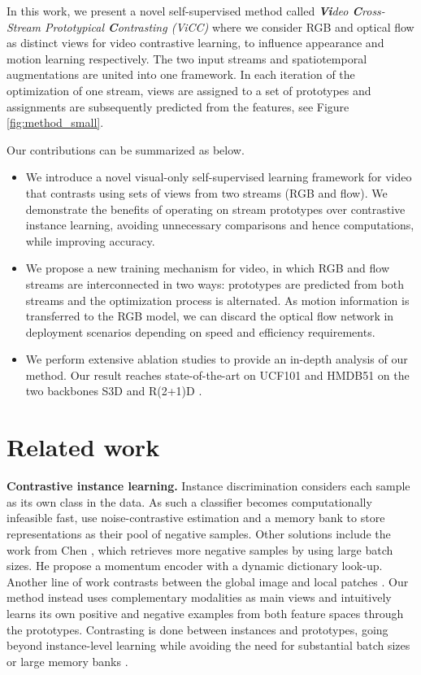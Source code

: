 \documentclass[10pt,twocolumn,letterpaper]{article}
\begin{document}
In this work, we present a novel self-supervised method called \noindent \textit{\noindent \textbf{Vi}deo \noindent \textbf{C}ross-Stream Prototypical \noindent \textbf{C}ontrasting (ViCC)} where we consider RGB and optical flow as distinct views for video contrastive learning, to influence appearance and motion learning respectively. The two input streams and spatiotemporal augmentations are united into one framework. In each iteration of the optimization of one stream, views are assigned to a set of prototypes and assignments are subsequently predicted from the features, see Figure \ref{fig:method_small}. 

Our contributions can be summarized as below.
\begin{itemize}[topsep=0pt,itemsep=-1ex,partopsep=1ex,parsep=1ex, leftmargin=*]
\item We introduce a novel visual-only self-supervised learning framework for video that contrasts using sets of views from two streams (RGB and flow). We demonstrate the benefits of operating on stream prototypes over contrastive instance learning, avoiding unnecessary comparisons and hence computations, while improving accuracy. 
\item We propose a new training mechanism for video, in which RGB and flow streams are interconnected in two ways: prototypes are predicted from both streams and the optimization process is alternated. As motion information is transferred to the RGB model, we can discard the optical flow network in deployment scenarios depending on speed and efficiency requirements. 
\item We perform extensive ablation studies to provide an in-depth analysis of our method. Our result reaches state-of-the-art on UCF101 \cite{soomro_ucf101_2012} and HMDB51 \cite{kuehne_hmdb_2011} on the two backbones S3D \cite{xie_rethinking_2018} and R(2+1)D \cite{tran_closer_2018}.
\end{itemize}

 \section{Related work}
\textbf{Contrastive instance learning.} Instance discrimination considers each sample as its own class in the data. As such a classifier becomes computationally infeasible fast, \cite{wu_unsupervised_2018} use noise-contrastive estimation \cite{gutmann_noise-contrastive_2012} and a memory bank to store representations as their pool of negative samples. Other solutions include the work from Chen \etal \cite{chen_improved_2020}, which retrieves more negative samples by using large batch sizes. He \etal \cite{he_momentum_2020} propose a momentum encoder with a dynamic dictionary look-up. Another line of work contrasts between the global image and local patches \cite{oord_representation_2019, hjelm_learning_2019}. Our method instead uses complementary modalities as main views and intuitively learns its own positive and negative examples from both feature spaces through the prototypes. Contrasting is done between instances and prototypes, going beyond instance-level learning while avoiding the need for substantial batch sizes \cite{chen_simple_2020} or large memory banks \cite{he_momentum_2020}. 
\end{document}
